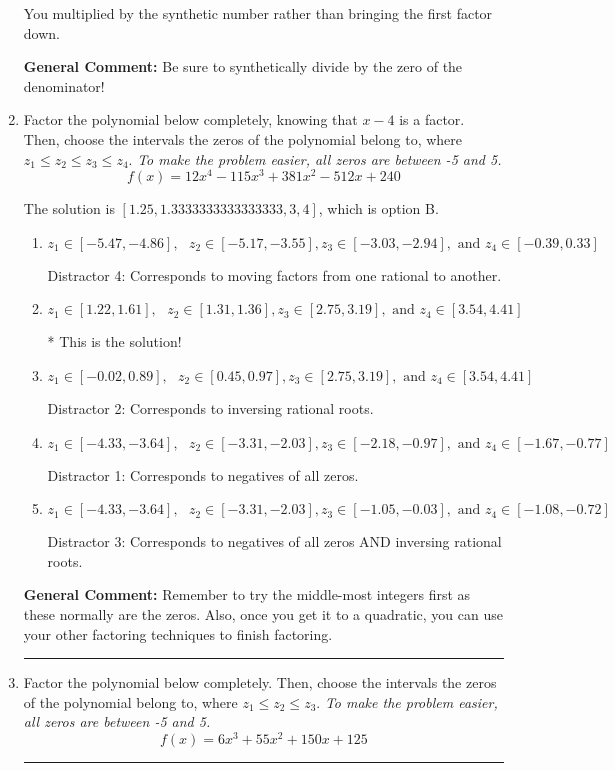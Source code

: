 \documentclass{extbook}[14pt]
\newcommand{\litem}[1]{\item #1

\rule{\textwidth}{0.4pt}}
\begin{document}
\begin{enumerate}
{\begin{enumerate}[label=\Alph*.]
 You multiplied by the synthetic number rather than bringing the first factor down.
\end{enumerate}

\textbf{General Comment:} Be sure to synthetically divide by the zero of the denominator!
}
\litem{
Factor the polynomial below completely, knowing that $x-4$ is a factor. Then, choose the intervals the zeros of the polynomial belong to, where $z_1 \leq z_2 \leq z_3 \leq z_4$. \textit{To make the problem easier, all zeros are between -5 and 5.}
\[ f(x) = 12x^{4} -115 x^{3} +381 x^{2} -512 x + 240 \]

The solution is \( [1.25, 1.3333333333333333, 3, 4] \), which is option B.\begin{enumerate}[label=\Alph*.]
\item \( z_1 \in [-5.47, -4.86], \text{   }  z_2 \in [-5.17, -3.55], z_3 \in [-3.03, -2.94], \text{   and   } z_4 \in [-0.39, 0.33] \)

 Distractor 4: Corresponds to moving factors from one rational to another.
\item \( z_1 \in [1.22, 1.61], \text{   }  z_2 \in [1.31, 1.36], z_3 \in [2.75, 3.19], \text{   and   } z_4 \in [3.54, 4.41] \)

* This is the solution!
\item \( z_1 \in [-0.02, 0.89], \text{   }  z_2 \in [0.45, 0.97], z_3 \in [2.75, 3.19], \text{   and   } z_4 \in [3.54, 4.41] \)

 Distractor 2: Corresponds to inversing rational roots.
\item \( z_1 \in [-4.33, -3.64], \text{   }  z_2 \in [-3.31, -2.03], z_3 \in [-2.18, -0.97], \text{   and   } z_4 \in [-1.67, -0.77] \)

 Distractor 1: Corresponds to negatives of all zeros.
\item \( z_1 \in [-4.33, -3.64], \text{   }  z_2 \in [-3.31, -2.03], z_3 \in [-1.05, -0.03], \text{   and   } z_4 \in [-1.08, -0.72] \)

 Distractor 3: Corresponds to negatives of all zeros AND inversing rational roots.
\end{enumerate}

\textbf{General Comment:} Remember to try the middle-most integers first as these normally are the zeros. Also, once you get it to a quadratic, you can use your other factoring techniques to finish factoring.
}
\litem{
Factor the polynomial below completely. Then, choose the intervals the zeros of the polynomial belong to, where $z_1 \leq z_2 \leq z_3$. \textit{To make the problem easier, all zeros are between -5 and 5.}
\[ f(x) = 6x^{3} +55 x^{2} +150 x + 125 \]

}
\end{enumerate}
\end{document}

